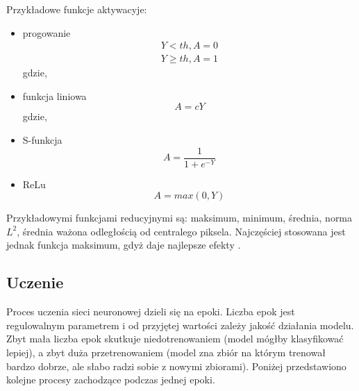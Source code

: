 Przykładowe funkcje aktywacyje:
\begin{itemize}
\item progowanie
\begin{equation*}
\begin{aligned}
Y < th, A = 0\\
Y \geq th, A = 1
\end{aligned}
\end{equation*}
gdzie,
\item funkcja liniowa
\begin{equation*}
A = cY
\end{equation*}
gdzie,
\item S-funkcja
\begin{equation*}
A = \frac{1}{1+e^{-Y}}
\end{equation*}
\item ReLu
\begin{equation*}
A = max(0,Y)
\end{equation*}
\end{itemize}

Przykładowymi funkcjami reducyjnymi są: maksimum, minimum, średnia, norma \begin{math}L^{2}\end{math}, średnia ważona odległością od centralego piksela. Najczęściej stosowana jest jednak funkcja maksimum, gdyż daje najlepsze efekty \cite{Scherer2010EvaluationOP}.

\subsection{Uczenie}
Proces uczenia sieci neuronowej dzieli się na epoki. Liczba epok jest regulowalnym parametrem i od przyjętej wartości zależy jakość działania modelu. Zbyt mała liczba epok skutkuje niedotrenowaniem (model mógłby klasyfikować lepiej), a zbyt duża przetrenowaniem (model zna zbiór na którym trenował bardzo dobrze, ale słabo radzi sobie z nowymi zbiorami). Poniżej przedstawiono kolejne procesy zachodzące podczas jednej epoki.


